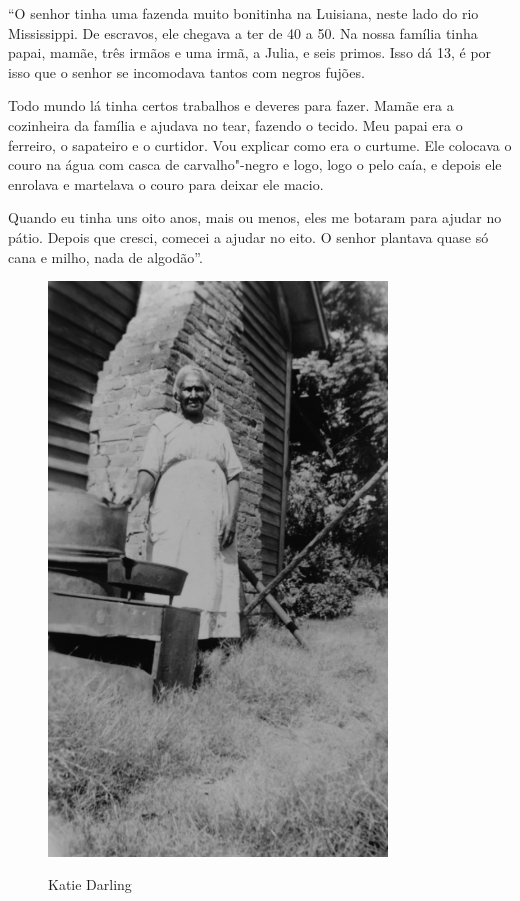 ``O senhor tinha uma fazenda muito bonitinha na Luisiana, neste lado do
rio Mississippi. De escravos, ele chegava a ter de 40 a 50. Na nossa
família tinha papai, mamãe, três irmãos e uma irmã, a Julia, e seis
primos. Isso dá 13, é por isso que o senhor se incomodava tantos com
negros fujões.

Todo mundo lá tinha certos trabalhos e deveres para fazer. Mamãe era a
cozinheira da família e ajudava no tear, fazendo o tecido. Meu papai era
o ferreiro, o sapateiro e o curtidor. Vou explicar como era o curtume.
Ele colocava o couro na água com casca de carvalho"-negro e logo, logo o
pelo caía, e depois ele enrolava e martelava o couro para deixar ele
macio.

Quando eu tinha uns oito anos, mais ou menos, eles me botaram para
ajudar no pátio. Depois que cresci, comecei a ajudar no eito. O senhor
plantava quase só cana e milho, nada de algodão''.

\begin{figure}[]
\centering
 \includegraphics[width=90mm]{./imgs/katiedarling_recorte.jpg} \label{img1}
\caption{Katie Darling}
\end{figure}


